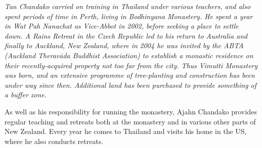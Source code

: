 \emph{Tan Chandako carried on training in Thailand under various
teachers, and also spent periods of time in Perth, living in Bodhinyana
Monastery. He spent a year in Wat Pah Nanachat as Vice-Abbot in 2002, 
before seeking a place to settle down. A Rains Retreat in the Czech
Republic led to his return to Australia and finally to Auckland, New
Zealand, where in 2004 he was invited by the ABTA (Auckland Theravāda 
Buddhist Association) to establish a monastic residence on their
recently-acquired property not too far from the city. Thus Vimutti
Monastery was born, and an extensive programme of tree-planting and
construction has been under way since then. Additional land has been
purchased to provide something of a buffer zone.}

As well as his responsibility for running the monastery, Ajahn Chandako
provides regular teaching and retreats both at the monastery and in
various other parts of New Zealand. Every year he comes to Thailand and
visits his home in the US, where he also conducts retreats. 


